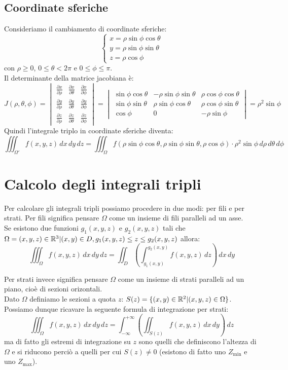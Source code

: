 \subsection{Coordinate sferiche}
Consideriamo il cambiamento di coordinate sferiche:
\[
\begin{cases}
  x = \rho \sin \phi \cos \theta \\
  y = \rho \sin \phi \sin \theta \\
  z = \rho \cos \phi
\end{cases}
\]
con $\rho \geq 0$, $0 \leq \theta < 2\pi$ e $0 \leq \phi \leq \pi$.\\
Il determinante della matrice jacobiana è:
\[
J(\rho, \theta, \phi) = \begin{vmatrix}
  \frac{\partial x}{\partial \rho} & \frac{\partial x}{\partial \theta} & \frac{\partial x}{\partial \phi} \\
  \frac{\partial y}{\partial \rho} & \frac{\partial y}{\partial \theta} & \frac{\partial y}{\partial \phi} \\
  \frac{\partial z}{\partial \rho} & \frac{\partial z}{\partial \theta} & \frac{\partial z}{\partial \phi}
\end{vmatrix} = \begin{vmatrix}
  \sin \phi \cos \theta & -\rho \sin \phi \sin \theta & \rho \cos \phi \cos \theta \\
  \sin \phi \sin \theta & \rho \sin \phi \cos \theta & \rho \cos \phi \sin \theta \\
  \cos \phi & 0 & -\rho \sin \phi
\end{vmatrix} = \rho^2 \sin \phi
\]
Quindi l'integrale triplo in coordinate sferiche diventa:
\[
\iiint_{\Omega'} f(x,y,z) \, dx \, dy \, dz = \iiint_{\Omega} f(\rho \sin \phi \cos \theta, \rho \sin \phi \sin \theta, \rho \cos \phi) \cdot \rho^2 \sin \phi \, d\rho \, d\theta \, d\phi
\]

\section{Calcolo degli integrali tripli}
Per calcolare gli integrali tripli possiamo procedere in due modi: per fili e per strati.
Per fili significa pensare $\Omega$ come un insieme di fili paralleli ad un asse.\\
Se esistono due funzioni $g_1(x,y,z)$ e $g_2(x,y,z)$ tali che $\Omega = {(x,y,z)\in \mathbb{R}^3|(x,y)\in D, g_1(x,y,z) \leq z \leq g_2(x,y,z)}$ allora:
\[
\iiint_{\Omega} f(x,y,z) \, dx \, dy \, dz = \iint_{D} \left( \int_{g_1(x,y)}^{g_2(x,y)} f(x,y,z) \, dz \right) \, dx \, dy
\]

Per strati invece significa pensare $\Omega$ come un insieme di strati paralleli ad un piano, cioè di sezioni orizontali.\\
Dato $\Omega$ definiamo le sezioni a quota $z$: $S(z) = \{(x,y)\in \mathbb{R}^2 | (x,y,z)\in \Omega\}$.\\
Possiamo dunque ricavare la seguente formula di integrazione per strati:
\[
\iiint_{\Omega} f(x,y,z) \, dx \, dy \, dz = \int_{-\infty}^{+\infty} \left( \iint_{S(z)} f(x,y,z) \, dx \, dy \right) \, dz
\]
ma di fatto gli estremi di integrazione su $z$ sono quelli che definiscono l'altezza di $\Omega$ e si riducono perciò a quelli per cui $S(z)\neq 0$ (esistono di fatto uno $Z_{\text{min}}$ e uno $Z_{\text{max}}$).
